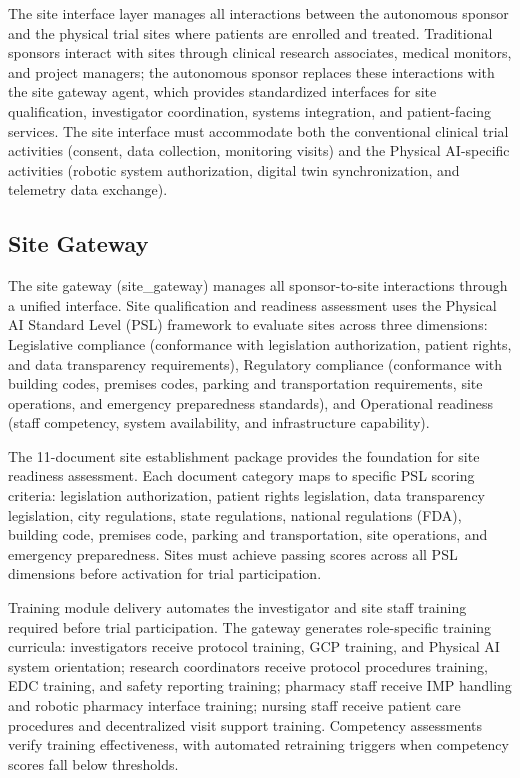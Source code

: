 
The site interface layer manages all interactions between the autonomous sponsor and the
physical trial sites where patients are enrolled and treated. Traditional sponsors interact
with sites through clinical research associates, medical monitors, and project managers;
the autonomous sponsor replaces these interactions with the site gateway agent, which
provides standardized interfaces for site qualification, investigator coordination, systems
integration, and patient-facing services. The site interface must accommodate both the
conventional clinical trial activities (consent, data collection, monitoring visits) and
the Physical AI-specific activities (robotic system authorization, digital twin
synchronization, and telemetry data exchange).

\subsection{Site Gateway}

The site gateway (site\_gateway) manages all sponsor-to-site interactions through a unified
interface. Site qualification and readiness assessment uses the Physical AI Standard Level
(PSL) framework \cite{national-platform-paper} to evaluate sites across three dimensions:
Legislative compliance (conformance with legislation authorization, patient rights, and
data transparency requirements), Regulatory compliance (conformance with building codes,
premises codes, parking and transportation requirements, site operations, and emergency
preparedness standards), and Operational readiness (staff competency, system availability,
and infrastructure capability).

The 11-document site establishment package \cite{site-docs} provides the foundation for
site readiness assessment. Each document category maps to specific PSL scoring criteria:
legislation authorization, patient rights legislation, data transparency legislation,
city regulations, state regulations, national regulations (FDA), building code, premises
code, parking and transportation, site operations, and emergency preparedness. Sites must
achieve passing scores across all PSL dimensions before activation for trial participation.

Training module delivery automates the investigator and site staff training required before
trial participation. The gateway generates role-specific training curricula: investigators
receive protocol training, GCP training, and Physical AI system orientation; research
coordinators receive protocol procedures training, EDC training, and safety reporting
training; pharmacy staff receive IMP handling and robotic pharmacy interface training;
nursing staff receive patient care procedures and decentralized visit support training.
Competency assessments verify training effectiveness, with automated retraining triggers
when competency scores fall below thresholds.

